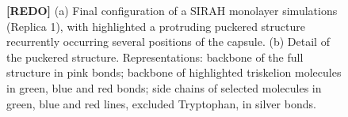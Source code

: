\begin{figure}[h!]
\centering
{}
\caption[Snapshot of SIRAH monolayer simulation]{\textbf{[REDO]} (a) Final configuration of a SIRAH monolayer simulations (Replica 1), with highlighted a protruding puckered structure recurrently occurring several positions of the capsule. (b) Detail of the puckered structure. Representations: backbone of the full structure in pink bonds; backbone of highlighted triskelion molecules in green, blue and red bonds; side chains of selected molecules in green, blue and red lines, excluded Tryptophan, in silver bonds.}
\label{fig:sirah_mono_pic}
\end{figure}












\clearpage




